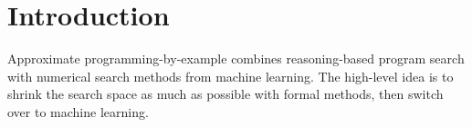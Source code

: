 
\section{Introduction}

Approximate programming-by-example combines reasoning-based program search with numerical search methods from machine learning.
The high-level idea is to shrink the search space as much as possible with formal methods, then switch over to machine learning.
